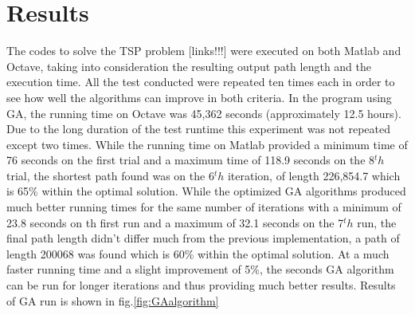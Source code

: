 \documentclass[twocolumn]{article}
\begin{document}
	\section{Results}
	The codes to solve the TSP problem [links!!!] were executed on both Matlab and Octave, taking into consideration the resulting output path length and the execution time. All the test conducted were repeated ten times each in order to see how well the algorithms can improve in both criteria. In the program using GA, the running time on Octave was 45,362 seconds (approximately 12.5 hours). Due to the long duration of the test runtime this experiment was not repeated except two times. While the running time on Matlab provided a minimum time of 76 seconds on the first trial and a maximum time of 118.9 seconds on the 8$^th$ trial, the shortest path found was on the 6$^th$ iteration, of length 226,854.7 which is 65\% within the optimal solution. While the optimized GA algorithms produced much better running times for the same number of iterations with a minimum of 23.8 seconds on th first run and a maximum of 32.1 seconds on the 7$^th$ run, the final path length didn't differ much from the previous implementation, a path of length 200068 was found which is 60\% within the optimal solution. At a much faster running time and a slight improvement of 5\%, the seconds GA algorithm can be run for longer iterations and thus providing much better results. Results of GA run is shown in fig.\ref{fig:GAalgorithm}
	
\end{document}
